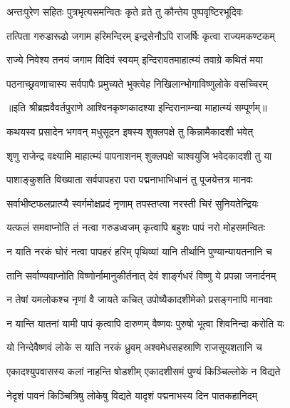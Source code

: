 \twolineshloka
{अन्तःपुरेण सहितः पुत्रभृत्यसमन्वितः}
{कृते व्रते तु कौन्तेय पुष्पवृष्टिरभूदिवः} %

\twolineshloka
{तत्पिता गरुडारूढो जगाम हरिमन्दिरम्}
{इन्द्रसेनौऽपि राजर्षिः कृत्वा राज्यमकण्टकम्} %

\twolineshloka
{राज्ये निवेश्य तनयं जगाम विदिवं स्वयम्}
{इन्दिरावतमाहात्म्यं तवाग्रे कथितं मया} %

\twolineshloka
{पठनाच्छ्रवणाचास्य सर्वपापैः प्रमुच्यते}
{भुक्त्वेह निखिलान्भोगाविष्णुलोके वसच्चिरम्} %

॥इति श्रीब्रह्मवैवर्तपुराणे आश्विनकृष्णकादश्या इन्दिरानाम्न्या माहात्म्यं सम्पूर्णम्॥



\twolineshloka
{कथयस्व प्रसादेन भगवन् मधुसूदन}
{इषस्य शुक्लपक्षे तु किन्नामैकादशी भवेत्} %


\twolineshloka
{शृणु राजेन्द्र वक्ष्यामि माहात्म्यं पापनाशनम्}
{शुक्लपक्षे चाश्वयुजि भवेदकादशी तु या} %

\twolineshloka
{पाशाङ्कुशति विख्याता सर्वपापहरा परा}
{पद्मनाभाभिधानं तु पूजयेत्तत्र मानवः} %

\twolineshloka
{सर्वाभीष्टफलप्रात्प्यै स्वर्गमोक्षप्रदं नृणाम्}
{तपस्तप्त्वा नरस्ती चिरं सुनियतेन्द्रियः} %

\twolineshloka
{यत्फलं समवाप्नोति तं नत्वा गरुडध्वजम्}
{कृत्वापि बहुशः पापं नरो मोहसमन्वितः} %

\twolineshloka
{न याति नरकं घोरं नत्वा पापहरं हरिम्}
{पृथिव्यां यानि तीर्थानि पुण्यान्यायतनानि च} %

\twolineshloka
{तानि सर्वाण्यवाप्नोति विष्णोर्नामानुकीर्तनात्}
{देवं शार्ङ्गधरं विष्णु ये प्रपन्ना जनार्दनम्} %

\twolineshloka
{न तेषां यमलोकश्च नृणां वै जायते कचित्}
{उपोष्यैकादशीमेको प्रसङ्गनापि मानवाः} %

\twolineshloka
{न यान्ति यातनां यामी पापं कृत्वापि दारुणम्}
{वैष्णवः पुरुषो भूत्वा शिवनिन्दा करोति यः} %

\twolineshloka
{यो निन्देवैष्णवं लोके स याति नरकं ध्रुवम्}
{अश्वमेधसहस्राणि राजसूयशतानि च} %

\twolineshloka
{एकादश्युपवासस्य कलां नाहन्ति षोडशीम्}
{एकादशीसमं पुण्यं किञ्चिल्लोके न विद्यते} %

\twolineshloka
{नेदृशं पावनं किञ्चित्रिषु लोकेषु विद्यते}
{यादृशं पद्मनाभस्य दिन पातकहानिदम्} %


